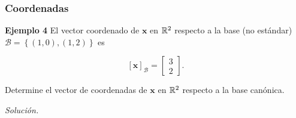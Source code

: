 \begin{frame}\frametitle{Coordenadas}
	
%		
	
	\vspace{0mm}
	
	\begin{ej}{\textbf{Ejemplo 4}}\justifying 
		El vector coordenado de $\mathbf{x}$ en $\mathbb{R}^2$ respecto a la base (no estándar) $\mathcal{B} = \left\{ (1,0), (1,2) \right\}$ 
		es
		
		\vspace{-3mm}
		\[
		\left[ \mathbf{x} \right]_{\mathcal{B}} = 
		\left[
		\begin{array}{c}
			3\\
			2
		\end{array}
		\right].
		\]
		
		Determine el vector de coordenadas de $\mathbf{x}$ en $\mathbb{R}^2$ respecto a la base canónica.
	\end{ej}
	\textit{Solución.}
	
\end{frame}


\subsection{}

